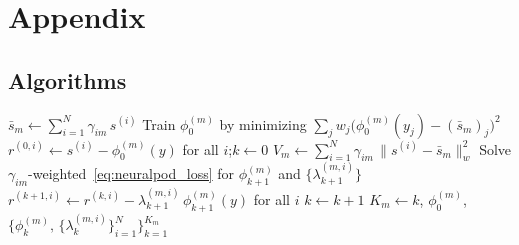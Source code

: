 \documentclass{article}
\begin{document}
\newpage
\appendix
\section{Appendix}\label{app}

\subsection{Algorithms}\label{app:alg}

\begin{algorithm}[H]
\caption{\textsc{WeightedNeuralPOD}$\bigl(
  \{s^{(i)}, \gamma_{im}\}_{i=1}^N,\;
  \tau\bigr)$}
\label{alg:npod}
\begin{algorithmic}[1]
\State $\bar{s}_m \leftarrow \displaystyle\sum_{i=1}^N \gamma_{im}\,s^{(i)}$
  \hfill{}
\State Train $\phi_0^{(m)}$ by minimizing
  $\displaystyle\sum_j w_j\bigl(\phi_0^{(m)}(y_j) - (\bar{s}_m)_j\bigr)^2$
\State $r^{(0,i)} \leftarrow s^{(i)} - \phi_0^{(m)}(y)$
  \enspace for all $i$;\enspace $k \leftarrow 0$
\State $V_m \leftarrow \displaystyle\sum_{i=1}^N \gamma_{im}\,\|s^{(i)}-\bar{s}_m\|_w^2$
  \hfill{}
  \State Solve $\gamma_{im}$-weighted~\eqref{eq:neuralpod_loss} for $\phi_{k+1}^{(m)}$ and $\bigl\{\lambda_{k+1}^{(m,i)}\bigr\}$
  \State $r^{(k+1,i)} \leftarrow r^{(k,i)}
    - \lambda_{k+1}^{(m,i)}\,\phi_{k+1}^{(m)}(y)$
    \enspace for all $i$
  \State $k \leftarrow k + 1$
\EndWhile
\State \Return $K_m \!\leftarrow\! k$,\enspace
  $\phi_0^{(m)}$,\enspace
  $\bigl\{\phi_k^{(m)},\,\{\lambda_k^{(m,i)}\}_{i=1}^N\bigr\}_{k=1}^{K_m}$
\end{algorithmic}
\end{algorithm}
\end{document}
